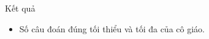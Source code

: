 Kết quả    
\begin{itemize}
	\item        Số câu đoán    đúng tối thiểu và tối đa của cô giáo.      
\end{itemize}